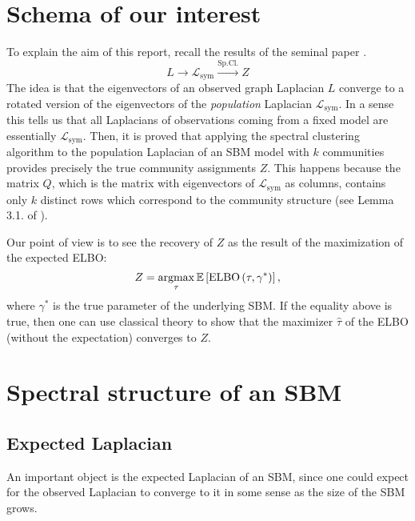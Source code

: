 \documentclass[../../main.tex]{subfiles} %
\begin{document}
	
\section{Schema of our interest}

To explain the aim of this report, recall the results of the seminal paper 
\cite{rohe_spectral_2011}.
\begin{dmath}
	L \rightarrow \mathscr L_{\text{sym}} \xrightarrow{\text{Sp.Cl.}} Z
\end{dmath}
The idea is that the eigenvectors of an observed graph Laplacian \(L\) converge 
to a rotated version of the eigenvectors of the \textit{population} Laplacian 
\(\mathscr L_{\text{sym}}\). In a sense this tells us that all Laplacians of 
observations coming from a fixed model are essentially \(\mathscr 
L_{\text{sym}}\). Then, it is proved that applying the spectral clustering 
algorithm to the population Laplacian of an SBM model with \(k\) communities 
provides precisely the true community assignments \(Z\). This happens because 
the matrix \(Q\), which is the matrix with eigenvectors of 
\(\mathscr{L}_{\text{sym}}\) as columns, contains only \(k\) distinct rows 
which correspond to the community structure (see Lemma 3.1. of 
\cite{rohe_spectral_2011}).

Our point of view is to see the recovery of \(Z\) as the result of the 
maximization of the expected ELBO:
\begin{dmath}
	Z = \argmax_\tau \mathbb{E} \left[\text{ELBO}\left(\tau, 
	\gamma^*\right)\right],
\end{dmath}
where \(\gamma^*\) is the true parameter of the underlying SBM. If the equality 
above is true, then one can use classical theory to show that the maximizer 
\(\hat \tau\) of the ELBO (without the expectation) converges to \(Z\).

\section{Spectral structure of an SBM}

\subsection{Expected Laplacian}

An important object is the expected Laplacian of an SBM, since one could expect 
for the observed Laplacian to converge to it in some sense as the size of the 
SBM grows.
\end{document}
